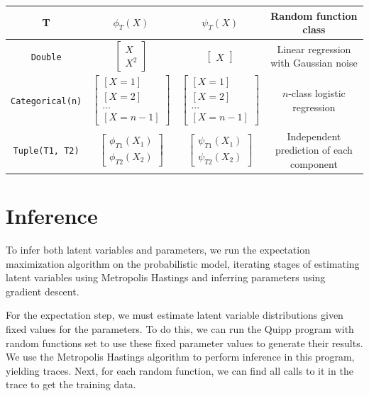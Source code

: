\documentclass{article}
\begin{document}
    \begin{tabular}{| c | c | c | c|}
      \hline
      T & $\phi_T(X)$ & $\psi_T(X)$ & Random function class \\

      \hline
    \texttt{Double} & $\begin{bmatrix} X \\ X^2 \end{bmatrix}$ & $\begin{bmatrix} X \end{bmatrix}$ & Linear regression with Gaussian noise \\

      \hline
    \texttt{Categorical(n)} & $\begin{bmatrix} [X = 1] \\ [X = 2] \\ ...\\ [X = n-1] \end{bmatrix}$ & $\begin{bmatrix} [X = 1] \\ [X = 2] \\ ...\\ [X = n-1] \end{bmatrix}$ & $n$-class logistic regression \\

      \hline
    \texttt{Tuple(T1, T2)} & $\begin{bmatrix} \phi_{T1}(X_1) \\ \phi_{T2}(X_2) \end{bmatrix}$
                           & $\begin{bmatrix} \psi_{T1}(X_1) \\ \psi_{T2}(X_2) \end{bmatrix}$ &
      Independent prediction of each component
      \\
      \hline
    \end{tabular}



  \section{Inference}

    To infer both latent variables and parameters, we run the
    expectation maximization algorithm on the probabilistic model, iterating stages of
    estimating latent variables using Metropolis Hastings and inferring
    parameters using gradient descent.

    For the expectation step, we must estimate latent variable distributions given
    fixed values for the parameters.  To do this, we can run the Quipp program
    with random functions set to use these fixed parameter values to generate their results.
    We use the Metropolis Hastings algorithm to perform inference in this program,
    yielding traces.  Next, for each random function, we can find all calls
    to it in the trace to get the training data.
\end{document}
